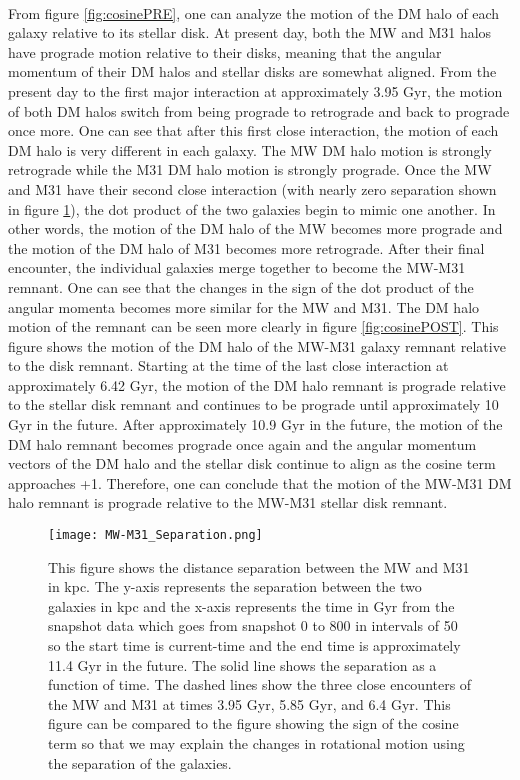 \documentclass[fleqn,usenatbib]{mnras}
\begin{document}
\paragraph{} From figure \ref{fig:cosinePRE}, one can analyze the motion of the DM halo of each galaxy relative to its stellar disk. At present day, both the MW and M31 halos have prograde motion relative to their disks, meaning that the angular momentum of their DM halos and stellar disks are somewhat aligned. From the present day to the first major interaction at approximately 3.95 Gyr, the motion of both DM halos switch from being prograde to retrograde and back to prograde once more. One can see that after this first close interaction, the motion of each DM halo is very different in each galaxy. The MW DM halo motion is strongly retrograde while the M31 DM halo motion is strongly prograde. Once the MW and M31 have their second close interaction (with nearly zero separation shown in figure \ref{fig:separation}), the dot product of the two galaxies begin to mimic one another. In other words, the motion of the DM halo of the MW becomes more prograde and the motion of the DM halo of M31 becomes more retrograde. After their final encounter, the individual galaxies merge together to become the MW-M31 remnant. One can see that the changes in the sign of the dot product of the angular momenta becomes more similar for the MW and M31. The DM halo motion of the remnant can be seen more clearly in figure \ref{fig:cosinePOST}. This figure shows the motion of the DM halo of the MW-M31 galaxy remnant relative to the disk remnant. Starting at the time of the last close interaction at approximately 6.42 Gyr, the motion of the DM halo remnant is prograde relative to the stellar disk remnant and continues to be prograde until approximately 10 Gyr in the future. After approximately 10.9 Gyr in the future, the motion of the DM halo remnant becomes prograde once again and the angular momentum vectors of the DM halo and the stellar disk continue to align as the cosine term approaches +1. Therefore, one can conclude that the motion of the MW-M31 DM halo remnant is prograde relative to the MW-M31 stellar disk remnant.

\begin{figure}
    \centering
    \texttt{[image: MW-M31\_Separation.png]}
    \caption{This figure shows the distance separation between the MW and M31 in kpc. The y-axis represents the separation between the two galaxies in kpc and the x-axis represents the time in Gyr from the snapshot data which goes from snapshot 0 to 800 in intervals of 50 so the start time is current-time and the end time is approximately 11.4 Gyr in the future. The solid line shows the separation as a function of time. The dashed lines show the three close encounters of the MW and M31 at times 3.95 Gyr, 5.85 Gyr, and 6.4 Gyr. This figure can be compared to the figure showing the sign of the cosine term so that we may explain the changes in rotational motion using the separation of the galaxies.}
    \label{fig:separation}
\end{figure}
\end{document}
